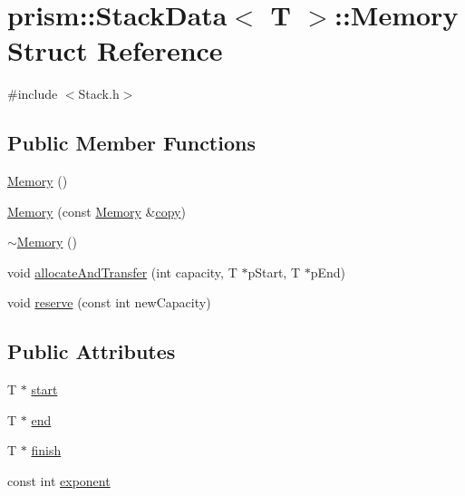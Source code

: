 \hypertarget{structprism_1_1_stack_data_1_1_memory}{}\section{prism\+:\+:Stack\+Data$<$ T $>$\+:\+:Memory Struct Reference}
\label{structprism_1_1_stack_data_1_1_memory}


{\ttfamily \#include $<$Stack.\+h$>$}

\subsection*{Public Member Functions}
\begin{DoxyCompactItemize}
\item 
\hyperlink{structprism_1_1_stack_data_1_1_memory_ad2395dc0984b60adfba6f0a57bbd47f8}{Memory} ()
\item 
\hyperlink{structprism_1_1_stack_data_1_1_memory_a9abfe931d4c5060414c6e0ecd74a98b3}{Memory} (const \hyperlink{structprism_1_1_stack_data_1_1_memory}{Memory} \&\hyperlink{namespaceprism_ae776f4cd825f79e7af1cf6ee1d90a209}{copy})
\item 
\hyperlink{structprism_1_1_stack_data_1_1_memory_a54cad12e62750eb6e3e05f480015282f}{$\sim$\+Memory} ()
\item 
void \hyperlink{structprism_1_1_stack_data_1_1_memory_a967d806859901f1e0fd4406a00317bac}{allocate\+And\+Transfer} (int capacity, T $\ast$p\+Start, T $\ast$p\+End)
\item 
void \hyperlink{structprism_1_1_stack_data_1_1_memory_a3550ff768b04ebda60863da7e4e38c21}{reserve} (const int new\+Capacity)
\end{DoxyCompactItemize}
\subsection*{Public Attributes}
\begin{DoxyCompactItemize}
\item 
T $\ast$ \hyperlink{structprism_1_1_stack_data_1_1_memory_a5ca6f889c85fca00ab1bbf7f93d994cb}{start}
\item 
T $\ast$ \hyperlink{structprism_1_1_stack_data_1_1_memory_a4c2fc53a644757cf033636c013265eeb}{end}
\item 
T $\ast$ \hyperlink{structprism_1_1_stack_data_1_1_memory_a9078f4f85440e6c401abfb4888ff4c50}{finish}
\item 
const int \hyperlink{structprism_1_1_stack_data_1_1_memory_a0a82a73b0dd4e34356f933b0ebcf4649}{exponent}
\end{DoxyCompactItemize}


